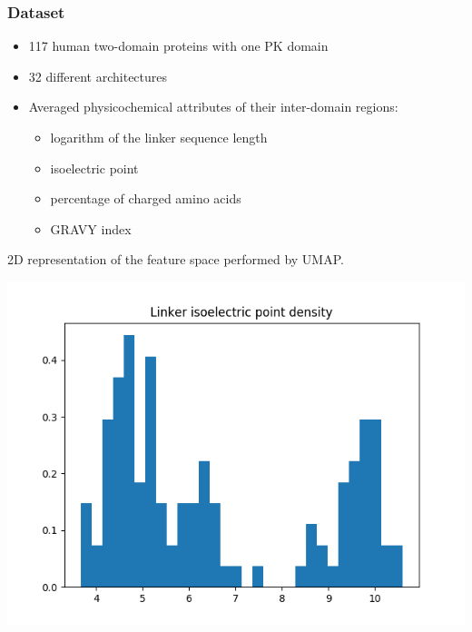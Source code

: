 \documentclass{beamer}
\begin{document}
  \begin{frame}
    \frametitle{Dataset}

    \begin{itemize}
      \item 117 human two-domain proteins with one PK domain
      \item 32 different architectures
      \item Averaged physicochemical attributes of their inter-domain regions:
      \begin{itemize}
        \item logarithm of the linker sequence length
        \item isoelectric point
        \item percentage of charged amino acids
        \item GRAVY index
      \end{itemize}
    \end{itemize}

    \vspace{5mm}

    2D representation of the feature space performed by UMAP.

  \end{frame}

  \begin{frame}[plain]
    \begin{center}
      \includegraphics[width=\textwidth]{img/iso_density.png}
    \end{center}
  \end{frame}
\end{document}
